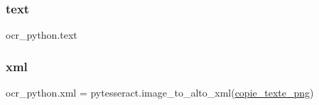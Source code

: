 \mbox{\label{namespaceocr__python_a1e093f59d752308f76c3c540793c2c7b}} 
\subsubsection{\texorpdfstring{text}{text}}
{\footnotesize\ttfamily ocr\+\_\+python.\+text}

\mbox{\label{namespaceocr__python_a57faf980a27f84b89e2d43f6046f976d}} 
\subsubsection{\texorpdfstring{xml}{xml}}
{\footnotesize\ttfamily ocr\+\_\+python.\+xml = pytesseract.\+image\+\_\+to\+\_\+alto\+\_\+xml(\hyperlink{namespaceocr__python_ad4d9e12f19b02ca8c63a6c39a06d7eaf}{copie\+\_\+texte\+\_\+png})}

